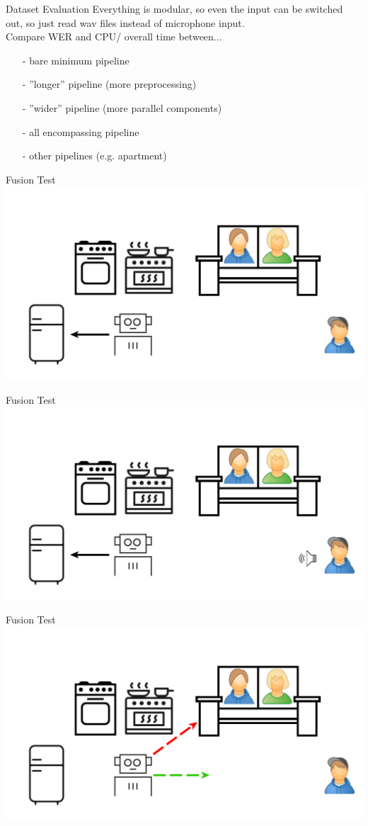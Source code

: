 \documentclass{beamer}
\begin{document}
	\begin{frame}{Dataset Evaluation}
		Everything is modular, so even the input can be switched out, so just read wav files instead of microphone input.\\

		Compare WER and CPU/ overall time between...
		\begin{itemize}
			\item[-] bare minimum pipeline
			\item[-] ''longer'' pipeline (more preprocessing)
			\item[-] ''wider'' pipeline (more parallel components)
			\item[-] all encompassing pipeline
			\item[-] other pipelines (e.g. apartment)
		\end{itemize}
	\end{frame}
	
	\begin{frame}{Fusion Test}
		\centering
		\includegraphics[width=.75\textwidth]{Bilder/fusion_test_0}
	\end{frame}
	
	\begin{frame}{Fusion Test}
		\centering
		\includegraphics[width=.75\textwidth]{Bilder/fusion_test_1}
	\end{frame}
	
	\begin{frame}{Fusion Test}
		\centering
		\includegraphics[width=.75\textwidth]{Bilder/fusion_test_2}
	\end{frame}
	
\end{document}
